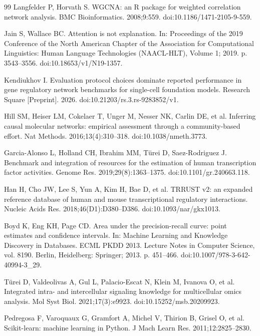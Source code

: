 \documentclass[10pt,letterpaper]{article}
\begin{document}
\begin{thebibliography}{99}
Langfelder P, Horvath S. WGCNA: an R package for weighted correlation network analysis. BMC Bioinformatics. 2008;9:559. doi:10.1186/1471-2105-9-559.

Jain S, Wallace BC. Attention is not explanation. In: Proceedings of the 2019 Conference of the North American Chapter of the Association for Computational Linguistics: Human Language Technologies (NAACL-HLT), Volume 1; 2019. p. 3543--3556. doi:10.18653/v1/N19-1357.

Kendiukhov I. Evaluation protocol choices dominate reported performance in gene regulatory network benchmarks for single-cell foundation models. Research Square [Preprint]. 2026. doi:10.21203/rs.3.rs-9283852/v1.

Hill SM, Heiser LM, Cokelaer T, Unger M, Nesser NK, Carlin DE, et al. Inferring causal molecular networks: empirical assessment through a community-based effort. Nat Methods. 2016;13(4):310--318. doi:10.1038/nmeth.3773.

Garcia-Alonso L, Holland CH, Ibrahim MM, T\"urei D, Saez-Rodriguez J. Benchmark and integration of resources for the estimation of human transcription factor activities. Genome Res. 2019;29(8):1363--1375. doi:10.1101/gr.240663.118.

Han H, Cho JW, Lee S, Yun A, Kim H, Bae D, et al. TRRUST v2: an expanded reference database of human and mouse transcriptional regulatory interactions. Nucleic Acids Res. 2018;46(D1):D380--D386. doi:10.1093/nar/gkx1013.

Boyd K, Eng KH, Page CD. Area under the precision-recall curve: point estimates and confidence intervals. In: Machine Learning and Knowledge Discovery in Databases. ECML PKDD 2013. Lecture Notes in Computer Science, vol. 8190. Berlin, Heidelberg: Springer; 2013. p. 451--466. doi:10.1007/978-3-642-40994-3\_29.

T\"urei D, Valdeolivas A, Gul L, Palacio-Escat N, Klein M, Ivanova O, et al. Integrated intra- and intercellular signaling knowledge for multicellular omics analysis. Mol Syst Biol. 2021;17(3):e9923. doi:10.15252/msb.20209923.

Pedregosa F, Varoquaux G, Gramfort A, Michel V, Thirion B, Grisel O, et al. Scikit-learn: machine learning in Python. J Mach Learn Res. 2011;12:2825--2830.


\end{thebibliography}
\end{document}
